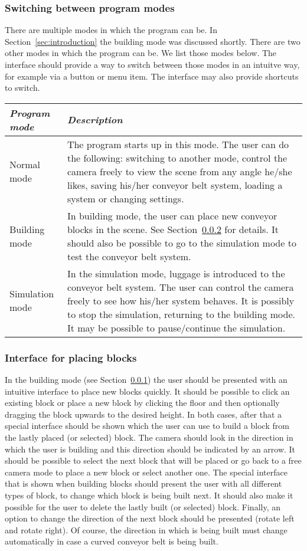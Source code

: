 \subsubsection{Switching between program modes}
\label{subsubsec:switch-program-modes}
There are multiple modes in which the program can be. In Section~\ref{sec:introduction} the building mode was discussed shortly. There are two other modes in which the program can be. We list those modes below. The interface should provide a way to switch between those modes in an intuitve way, for example via a button or menu item. The interface may also provide shortcuts to switch.
\begin{longtabu} to 
  \toprule
  \textit{Program mode} & \textit{Description} \\
  \midrule
  \endhead
  \bottomrule
  \endfoot
  Normal mode & The program starts up in this mode. The user can do the following: switching to another mode, control the camera freely to view the scene from any angle he/she likes, saving his/her conveyor belt system, loading a system or changing settings.  \\
  Building mode & In building mode, the user can place new conveyor blocks in the scene. See Section~\ref{subsubsec:interface-placing-blocks} for details. It should also be possible to go to the simulation mode to test the conveyor belt system. \\
  Simulation mode & In the simulation mode, luggage is introduced to the conveyor belt system. The user can control the camera freely to see how his/her system behaves. It is possibly to stop the simulation, returning to the building mode. It may be possible to pause/continue the simulation. \\
\end{longtabu}

\subsubsection{Interface for placing blocks}
\label{subsubsec:interface-placing-blocks}
In the building mode (see Section~\ref{subsubsec:switch-program-modes}) the user should be presented with an intuitive interface to place new blocks quickly. It should be possible to click an existing block or place a new block by clicking the floor and then optionally dragging the block upwards to the desired height. In both cases, after that a special interface should be shown which the user can use to build a block from the lastly placed (or selected) block. The camera should look in the direction in which the user is building and this direction should be indicated by an arrow. It should be possible to select the next block that will be placed or go back to a free camera mode to place a new block or select another one. The special interface that is shown when building blocks should present the user with all different types of block, to change which block is being built next. It should also make it possible for the user to delete the lastly built (or selected) block. Finally, an option to change the direction of the next block should be presented (rotate left and rotate right). Of course, the direction in which is being built must change automatically in case a curved conveyor belt is being built.